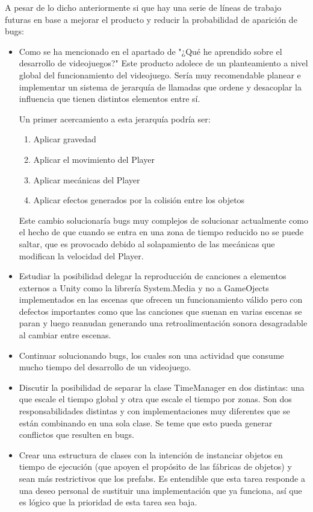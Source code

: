 A pesar de lo dicho anteriormente si que hay una serie de líneas de trabajo futuras en base a mejorar el producto y reducir la probabilidad de aparición de bugs:

\begin{itemize}
\item
Como se ha mencionado en el apartado de "¿Qué he aprendido sobre el desarrollo de videojuegos?" Este producto adolece de un planteamiento a nivel global del funcionamiento del videojuego. Sería muy recomendable planear e implementar un sistema de jerarquía de llamadas que ordene y desacoplar la influencia que tienen distintos elementos entre sí.

Un primer acercamiento a esta jerarquía podría ser:
\begin{enumerate}
\item
Aplicar gravedad
\item
Aplicar el movimiento del Player
\item
Aplicar mecánicas del Player
\item
Aplicar efectos generados por la colisión entre los objetos
\end{enumerate}

Este cambio solucionaría bugs muy complejos de solucionar actualmente como el hecho de que cuando se entra en una zona de tiempo reducido no se puede saltar, que es provocado debido al solapamiento de las mecánicas que modifican la velocidad del Player.

\item
Estudiar la posibilidad delegar la reproducción de canciones a elementos externos a Unity como la librería System.Media y no a GameOjects implementados en las escenas que ofrecen un funcionamiento válido pero con defectos importantes como que las canciones que suenan en varias escenas se paran y luego reanudan generando una retroalimentación sonora desagradable al cambiar entre escenas.

\item
Continuar solucionando bugs, los cuales son una actividad que consume mucho tiempo del desarrollo de un videojuego.

\item
Discutir la posibilidad de separar la clase TimeManager en dos distintas: una que escale el tiempo global y otra que escale el tiempo
por zonas. Son dos responsabilidades distintas y con implementaciones muy diferentes que se están combinando en una sola clase. Se teme que esto pueda generar conflictos que resulten en bugs.

\item
Crear una estructura de clases con la intención de instanciar objetos en tiempo de ejecución (que apoyen el propósito de las fábricas de objetos) y sean más restrictivos que los prefabs. Es entendible que esta tarea responde a una deseo personal de sustituir una implementación que ya funciona, así que es lógico que la prioridad de esta tarea sea baja.
\end{itemize}